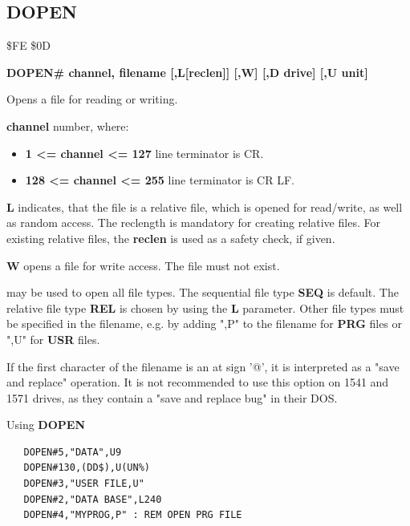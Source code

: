 \subsection{DOPEN}
\begin{description}[leftmargin=2cm,style=nextline]
\item [Token:] \$FE \$0D
\item [Format:]
  {\bf DOPEN\# channel, filename [,L[reclen]] [,W] [,D drive] [,U unit] }
\item [Usage:]
    Opens a file for reading or writing.

    {\bf channel} number, where:
    \begin{itemize}
        \item {\bf 1 <= channel <= 127} line terminator is CR.
        \item {\bf 128 <= channel <= 255} line terminator is CR LF.
    \end{itemize}

   {\bf L} indicates, that the file is a relative file, which
   is opened for read/write, as well as random access. The reclength
   is mandatory for creating relative files. For existing
   relative files, the {\bf reclen} is used as a safety check, if given.

   {\bf W} opens a file for write access. The file must not exist.

   \filenamedefinition

   \drivedefinition

   \unitdefinition

\item [Remarks:]
    may be used to open all file types.
   The sequential file type {\bf SEQ} is default.
   The relative file type {\bf REL} is chosen by using the
   {\bf L} parameter.  Other file types
   must be specified in the filename, e.g. by adding ",P" to the
   filename for {\bf PRG} files or ",U" for {\bf USR} files.

   If the first character of the filename is an at sign '@', it
   is interpreted as a "save and replace" operation. It is not recommended
   to use this option on 1541 and 1571 drives, as they
   contain a "save and replace bug" in their DOS.

\newpage
\item [Examples:] Using {\bf DOPEN}

\begin{tcolorbox}[colback=black,coltext=white]
\verbatimfont{\codefont}
\begin{verbatim}
   DOPEN#5,"DATA",U9
   DOPEN#130,(DD$),U(UN%)
   DOPEN#3,"USER FILE,U"
   DOPEN#2,"DATA BASE",L240
   DOPEN#4,"MYPROG,P" : REM OPEN PRG FILE
\end{verbatim}
\end{tcolorbox}
\end{description}

